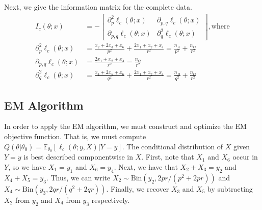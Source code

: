 \documentclass[11pt, oneside]{article}   	%
\newcommand{\bE}{\mathbb{E}}
\begin{document}
\begin{appendices}
    Next, we give the information matrix for the complete data.
    \begin{align}
        I_c(\theta;x) &= - \begin{bmatrix}
            \partial^2_p \ell_c(\theta; x) & \partial_{p,q} \ell_c(\theta; x)\\
            \partial_{p,q} \ell_c(\theta; x) & \partial^2_q \ell_c(\theta; x)
        \end{bmatrix} \mathrm{, where}\\
        \partial^2_p \ell_c(\theta; x) &=  \frac{x_2 + 2 x_3 + x_6}{p^2} + \frac{2x_1 + x_2 + x_4}{r^2} = \frac{n_A}{p^2} + \frac{n_O}{r^2}\\
        \partial_{p,q} \ell_c(\theta; x) &=   \frac{2x_1 + x_2 + x_4}{r^2} = \frac{n_O}{r^2}\\
        \partial^2_q \ell_c(\theta; x) &=  \frac{x_4 + 2 x_5 + x_6}{q^2} + \frac{2x_1 + x_2 + x_4}{r^2} = \frac{n_B}{q^2} + \frac{n_O}{r^2}
    \end{align}
    

    \subsection{EM Algorithm}

    In order to apply the EM algorithm, we must construct and optimize the EM objective function. That is, we must compute $Q(\theta|\theta_0) = \bE_{\theta_0} \left[ \ell_c(\theta; y, X) | Y=y \right]$. The conditional distribution of $X$ given $Y=y$ is best described componentwise in $X$. First, note that $X_1$ and $X_6$ occur in $Y$, so we have $X_1 = y_1$ and $X_6 = y_4$. Next, we have that $X_2 + X_3 = y_2$ and $X_4 + X_5 = y_3$. Thus, we can write $X_2 \sim \mathrm{Bin}(y_2, 2pr / (p^2 + 2pr))$ and $X_4 \sim \mathrm{Bin}(y_3, 2qr / (q^2 + 2qr))$. Finally, we recover $X_3$ and $X_5$ by subtracting $X_2$ from $y_2$ and $X_4$ from $y_3$ respectively.
    

\end{appendices}
\end{document}
